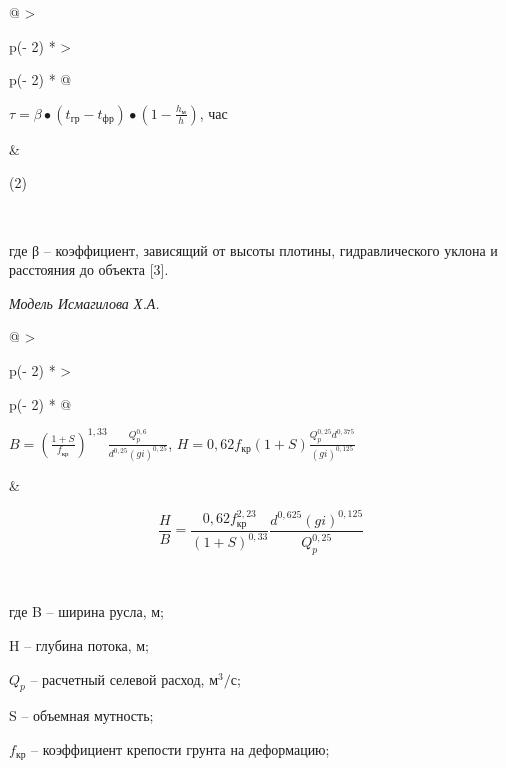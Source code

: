 \begin{longtable}[]{@{}
  >{\raggedright\arraybackslash}p{(\columnwidth - 2\tabcolsep) * }
  >{\raggedright\arraybackslash}p{(\columnwidth - 2\tabcolsep) * }@{}}
\toprule\noalign{}
\begin{minipage}[b]{\linewidth}\raggedright
\(\tau = \beta \bullet \left( t_{гр} - t_{фр} \right) \bullet \left( 1 - \frac{h_{м}}{h} \right)\),
час
\end{minipage} & \begin{minipage}[b]{\linewidth}\raggedright
(2)
\end{minipage} \\
\midrule\noalign{}
\endhead
\bottomrule\noalign{}
\endlastfoot
\end{longtable}

где β -- коэффициент, зависящий от высоты плотины, гидравлического
уклона и расстояния до объекта {[}3{]}.

\emph{Модель Исмагилова Х.А.}

\begin{longtable}[]{@{}
  >{\raggedright\arraybackslash}p{(\columnwidth - 2\tabcolsep) * }
  >{\raggedright\arraybackslash}p{(\columnwidth - 2\tabcolsep) * }@{}}
\toprule\noalign{}
\begin{minipage}[b]{\linewidth}\raggedright
\(B = \left( \frac{1 + S}{f_{кр}} \right)^{1,33}\frac{Q_{p}^{0,6}}{d^{0,25}(gi)^{0,25}}\),
\(H = 0,62f_{кр}(1 + S)\frac{Q_{p}^{0,25}d^{0,375}}{(gi)^{0,125}}\)
\end{minipage} &
 \\
\begin{minipage}[b]{\linewidth}\raggedright
\[\frac{H}{B} = \frac{0,62f_{кр}^{2,23}}{{(1 + S)}^{0,33}}\frac{d^{0,625}(gi)^{0,125}}{Q_{p}^{0,25}}\]
\end{minipage} \\
\midrule\noalign{}
\endhead
\bottomrule\noalign{}
\endlastfoot
\end{longtable}

где B -- ширина русла, м;

H -- глубина потока, м;

\(Q_{p}\) -- расчетный селевой расход, \(м^{3}/с\);

S -- объемная мутность;

\(f_{кр}\) -- коэффициент крепости грунта на деформацию;

